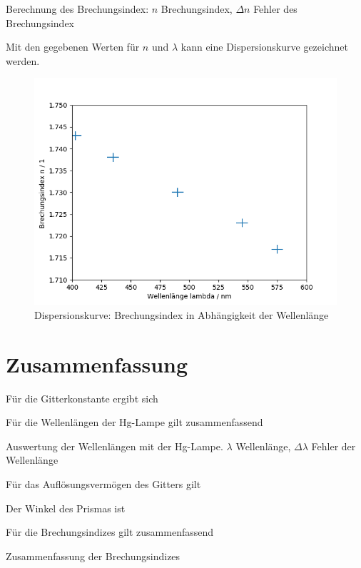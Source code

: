 \documentclass{article}
\begin{document}
\begin{table}[H]
\caption{Berechnung des Brechungsindex: $n$ Brechungsindex, $\Delta n$ Fehler des Brechungsindex}
\label{tab:prisma_brechung}
\centering

\end{table}


Mit den gegebenen Werten für $n$ und $\lambda$ kann eine Dispersionskurve gezeichnet werden.
\begin{figure}[H]
\label{fig:dispersion}
\includegraphics[scale=0.7]{kurve.png}
\caption{Dispersionskurve: Brechungsindex in Abhängigkeit der Wellenlänge}
\end{figure}



\section{Zusammenfassung}

Für die Gitterkonstante ergibt sich


Für die Wellenlängen der Hg-Lampe gilt zusammenfassend
\begin{table}[H]
\caption{Auswertung der Wellenlängen mit der Hg-Lampe. $\lambda$ Wellenlänge, $\Delta\lambda$ Fehler der Wellenlänge}
\centering

\end{table}

Für das Auflösungsvermögen des Gitters gilt


Der Winkel des Prismas ist



Für die Brechungsindizes gilt zusammenfassend
\begin{table}[H]
\caption{Zusammenfassung der Brechungsindizes}
\centering

\end{table}
\end{document}

